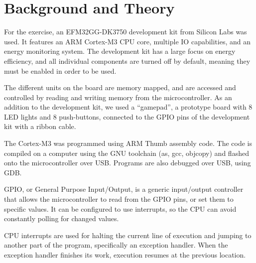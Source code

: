 \chapter{Background and Theory}
For the exercise, an EFM32GG-DK3750 development kit from Silicon Labs was used. It features an ARM Cortex-M3 CPU core, multiple IO capabilities, and an energy monitoring system. The development kit has a large focus on energy efficiency, and all individual components are turned off by default, meaning they must be enabled in order to be used.

The different units on the board are memory mapped, and are accessed and controlled by reading and writing memory from the microcontroller. As an addition to the development kit, we used a ``gamepad'', a prototype board with 8 LED lights and 8 push-buttons, connected to the GPIO pins of the development kit with a ribbon cable.

The Cortex-M3 was programmed using ARM Thumb assembly code. The code is compiled on a computer using the GNU toolchain (as, gcc, objcopy) and flashed onto the microcontroller over USB. Programs are also debugged over USB, using GDB.

GPIO, or General Purpose Input/Output, is a generic input/output controller that allows the microcontroller to read from the GPIO pins, or set them to specific values. It can be configured to use interrupts, so the CPU can avoid constantly polling for changed values.

CPU interrupts are used for halting the current line of execution and jumping to another part of the program, specifically an exception handler. When the exception handler finishes its work, execution resumes at the previous location.